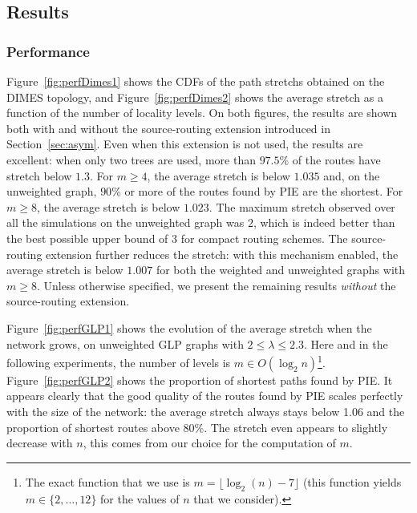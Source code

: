 \documentclass[conference]{IEEEtran}
\begin{document}
\subsection{Results}



\subsubsection{Performance}
Figure~\ref{fig:perfDimes1} shows the CDFs of the path stretchs obtained on the DIMES topology, and Figure~\ref{fig:perfDimes2} shows the average stretch as a function of the number of locality levels. On both figures, the results are shown both with and without the source-routing extension introduced in Section~\ref{sec:asym}. Even when this extension is not used, the results are excellent: when only two trees are used, more than $97.5$\% of the routes have stretch below $1.3$. For $m \geq 4$, the average stretch is below $1.035$ and, on the unweighted graph, $90$\% or more of the routes found by PIE are the shortest. For $m \geq 8$, the average stretch is below $1.023$. 
The maximum stretch observed over all the simulations on the unweighted graph was $2$, which is indeed better than the best possible upper bound of $3$ for compact routing schemes.
The source-routing extension further reduces the stretch: with this mechanism enabled, the average stretch is below $1.007$ for both the weighted and unweighted graphs with $m \geq 8$. Unless otherwise specified, we present the remaining results \emph{without} the source-routing extension.






Figure~\ref{fig:perfGLP1} shows the evolution of the average stretch when the network grows, on unweighted GLP graphs with $2 \leq \lambda \leq 2.3$. Here and in the following experiments, the number of levels is $m \in O(\log_2 n)$\footnote{The exact function that we use is $m = \lfloor \log_2(n) - 7\rfloor$ (this function yields $m \in \{2,\ldots,12\}$ for the values of $n$ that we consider).}. Figure~\ref{fig:perfGLP2} shows the proportion of shortest paths found by PIE. It appears clearly that the good quality of the routes found by PIE scales perfectly with the size of the network: the average stretch always stays below 1.06 and the proportion of shortest routes above $80$\%. The stretch even appears to slightly decrease with $n$, this comes from our choice for the computation of $m$.
\end{document}

